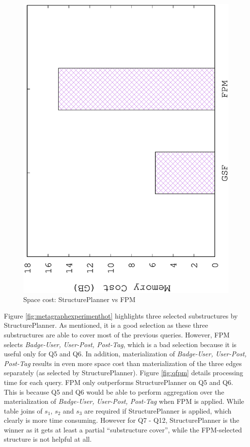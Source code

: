 \begin{figure}[H]
	\centering
	\includegraphics[scale=0.47, angle=270]{plot/fpm_space.eps}
	\caption{Space cost: StructurePlanner vs FPM}
	\label{fig:fpmspace}
\end{figure}

Figure \ref{fig:metagraphexperimenthot} highlights three selected substructures by StructurePlanner. As mentioned, it is a good selection as these three substructures are able to cover most of the previous queries. However, FPM selects \textit{Badge-User, User-Post, Post-Tag}, which is a bad selection because it is useful only for Q5 and Q6. In addition, materialization of \textit{Badge-User, User-Post, Post-Tag} results in even more space cost than materialization of the three edges separately (as selected by StructurePlanner). Figure \ref{fig:qfpm} details processing time for each query. FPM only outperforms StructurePlanner on Q5 and Q6. This is because Q5 and Q6 would be able to perform aggregation over the materialization of \textit{Badge-User, User-Post, Post-Tag} when FPM is applied. While table joins of $s_1$, $s_2$ and $s_3$ are required if StructurePlanner is applied, which clearly is more time consuming. However for Q7 - Q12, StructurePlanner is the winner as it gets at least a partial ``substructure cover'', while the FPM-selected structure is not helpful at all.

